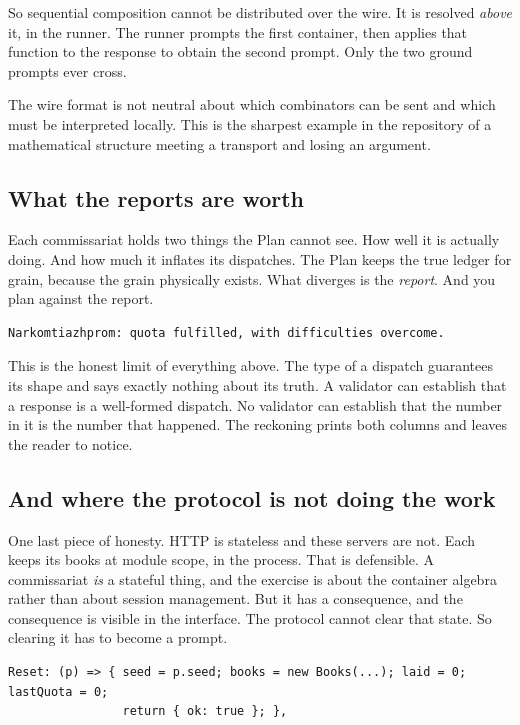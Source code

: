 \documentclass[11pt,a4paper]{article}
\begin{document}
So sequential composition cannot be distributed over the wire. It is resolved \emph{above} it, in
the runner. The runner prompts the first container, then applies that function to the response to
obtain the second prompt. Only the two ground prompts ever cross.

The wire format is not neutral about which combinators can be sent and which must be interpreted
locally. This is the sharpest example in the repository of a mathematical structure meeting a
transport and losing an argument.

\subsection{What the reports are worth}

Each commissariat holds two things the Plan cannot see. How well it is actually doing. And how
much it inflates its dispatches. The Plan keeps the true ledger for grain, because the grain
physically exists. What diverges is the \emph{report}. And you plan against the report.

\begin{lstlisting}
Narkomtiazhprom: quota fulfilled, with difficulties overcome.
\end{lstlisting}

This is the honest limit of everything above. The type of a dispatch guarantees its shape and says
exactly nothing about its truth. A validator can establish that a response is a well-formed dispatch.
No validator can establish that the number in it is the number that happened. The reckoning prints
both columns and leaves the reader to notice.

\subsection{And where the protocol is not doing the work}

One last piece of honesty. HTTP is stateless and these servers are not. Each keeps its books at
module scope, in the process. That is defensible. A commissariat \emph{is} a stateful thing, and
the exercise is about the container algebra rather than about session management. But it has a
consequence, and the consequence is visible in the interface. The protocol cannot clear that state.
So clearing it has to become a prompt.

\begin{lstlisting}[language=TS]
Reset: (p) => { seed = p.seed; books = new Books(...); laid = 0; lastQuota = 0;
                return { ok: true }; },
\end{lstlisting}
\end{document}
